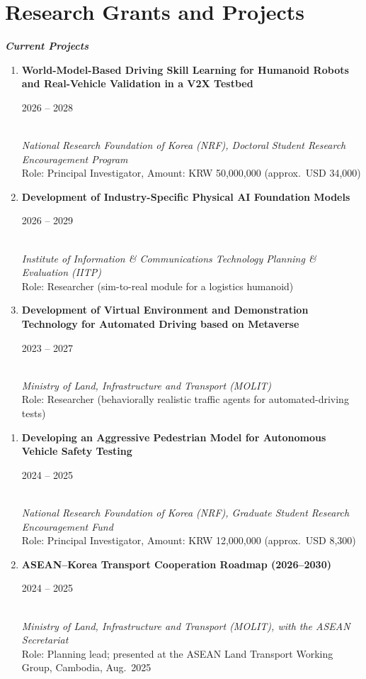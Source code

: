 \documentclass[12pt]{article}
\newlength{\blockgap}\setlength{\blockgap}{14pt}
\newcommand{\subhead}[1]{\par\vspace{\blockgap}{\fontsize{13pt}{15.5pt}\selectfont\bfseries\itshape #1}\par\vspace{6pt}}
\newcommand{\firstsubhead}[1]{\par{\fontsize{13pt}{15.5pt}\selectfont\bfseries\itshape #1}\par\vspace{6pt}}
\newcommand{\projtitle}[2]{\parbox[t]{\dimexpr\linewidth-6.2em}{\raggedright\textbf{#1}\strut}\hfill\parbox[t]{6em}{\raggedleft\leavevmode\color{meta}#2}\\}
\begin{document}
\section*{Research Grants and Projects}
\firstsubhead{Current Projects}
\begin{enumerate}[label=\textbf{\arabic*.}]
\item \projtitle{World-Model-Based Driving Skill Learning for Humanoid Robots and Real-Vehicle Validation in a V2X Testbed}{2026 -- 2028}
\textit{National Research Foundation of Korea (NRF), Doctoral Student Research Encouragement Program}\\
Role: Principal Investigator, Amount: KRW 50,000,000 (approx.\ USD 34,000)
\item \projtitle{Development of Industry-Specific Physical AI Foundation Models}{2026 -- 2029}
\textit{Institute of Information \& Communications Technology Planning \& Evaluation (IITP)}\\
Role: Researcher (sim-to-real module for a logistics humanoid)
\item \projtitle{Development of Virtual Environment and Demonstration Technology for Automated Driving based on Metaverse}{2023 -- 2027}
\textit{Ministry of Land, Infrastructure and Transport (MOLIT)}\\
Role: Researcher (behaviorally realistic traffic agents for automated-driving tests)
\end{enumerate}
\subhead{Selected Completed Projects}
\begin{enumerate}[label=\textbf{\arabic*.}]
\item \projtitle{Developing an Aggressive Pedestrian Model for Autonomous Vehicle Safety Testing}{2024 -- 2025}
\textit{National Research Foundation of Korea (NRF), Graduate Student Research Encouragement Fund}\\
Role: Principal Investigator, Amount: KRW 12,000,000 (approx.\ USD 8,300)
\item \projtitle{ASEAN--Korea Transport Cooperation Roadmap (2026--2030)}{2024 -- 2025}
\textit{Ministry of Land, Infrastructure and Transport (MOLIT), with the ASEAN Secretariat}\\
Role: Planning lead; presented at the ASEAN Land Transport Working Group, Cambodia, Aug.\ 2025
\end{enumerate}
\end{document}
